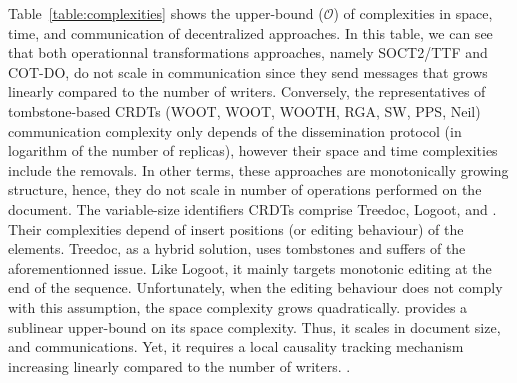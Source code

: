 Table~\ref{table:complexities} shows the upper-bound ($\mathcal{O}$)
of complexities in space, time, and communication of decentralized
approaches. In this table, we can see that both operationnal
transformations approaches, namely SOCT2/TTF and COT-DO, do not scale
in communication since they send messages that grows linearly compared
to the number of writers. Conversely, the representatives of
tombstone-based CRDTs (WOOT, WOOT, WOOTH, RGA, SW, PPS, Neil)
communication complexity only depends of the dissemination protocol
(in logarithm of the number of replicas), however their space and time
complexities include the removals. In other terms, these approaches
are monotonically growing structure, hence, they do not scale in
number of operations performed on the document. The variable-size
identifiers CRDTs comprise Treedoc, Logoot, and \LSEQ. Their
complexities depend of insert positions (or editing behaviour) of the
elements. Treedoc, as a hybrid solution, uses tombstones and suffers
of the aforementionned issue. Like Logoot, it mainly targets monotonic
editing at the end of the sequence. Unfortunately, when the editing
behaviour does not comply with this assumption, the space complexity
grows quadratically. \LSEQ provides a sublinear upper-bound on its
space complexity. Thus, it scales in document size, and
communications. Yet, it requires a local causality tracking mechanism
increasing linearly compared to the number of
writers. .


